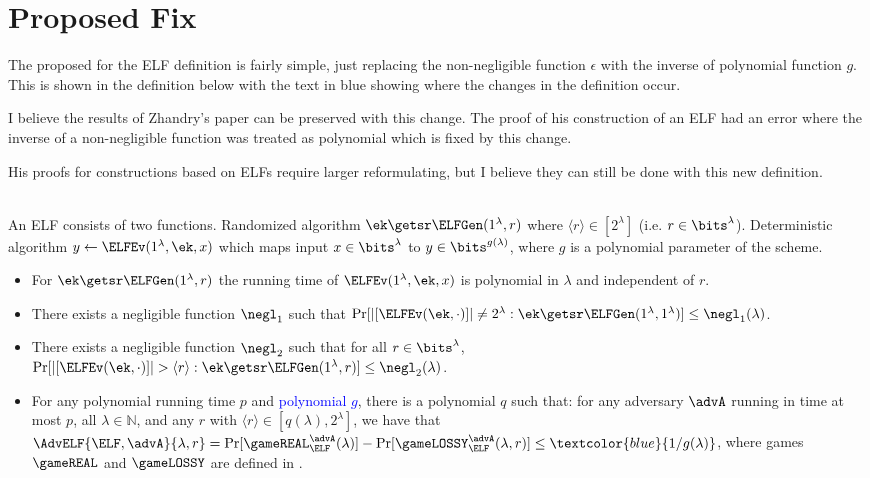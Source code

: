 
\section{Proposed Fix}\label{sec-fix}
The proposed for the ELF definition is fairly simple, just replacing the non-negligible function $\epsilon$ with the inverse of polynomial function $g$. This is shown in the definition below with the text in blue showing where the changes in the definition occur.

I believe the results of Zhandry's paper can be preserved with this change. The proof of his construction of an ELF had an error where the inverse of a non-negligible function was treated as polynomial which is fixed by this change.

His proofs for constructions based on ELFs require larger reformulating, but I believe they can still be done with this new definition.

\\
An ELF consists of two functions. Randomized algorithm $\ek\getsr\ELFGen(1^\lambda,r)$ where $\langle r\rangle \in [2^\lambda]$ (i.e. $r\in\bits^\lambda$). Deterministic algorithm $y \gets \ELFEv(1^\lambda,\ek,x)$ which maps input $x\in\bits^{\lambda}$ to $y\in\bits^{g(\lambda)}$, where $g$ is a polynomial parameter of the scheme.

\begin{itemize}
	\item For $\ek\getsr\ELFGen(1^\lambda,r)$ the running time of $\ELFEv(1^\lambda,\ek,x)$ is polynomial in $\lambda$ and independent of $r$.
	\item There exists a negligible function $\negl_1$ such that $\Pr[|[\ELFEv(\ek,\cdot)]|\neq 2^\lambda : \ek\getsr\ELFGen(1^\lambda,1^\lambda)]\leq \negl_1(\lambda)$.
	\item There exists a negligible function $\negl_2$ such that for all $r \in \bits^\lambda$, $\Pr[|[\ELFEv(\ek,\cdot)]| > \langle r\rangle : \ek\getsr\ELFGen(1^\lambda,r) ]\leq \negl_2(\lambda)$.
	\item For any polynomial running time $p$ and \textcolor{blue}{polynomial $g$}, there is a polynomial $q$ such that: for any adversary $\advA$ running in time at most $p$, all $\lambda\in\mathbb{N}$, and any $r$ with $\langle r \rangle \in [q(\lambda), 2^\lambda]$, we have that $\AdvELF{\ELF,\advA}{\lambda,r} \allowbreak =  \allowbreak\Pr[\gameREAL_{\ELF}^{\advA}(\lambda)]-\Pr[\gameLOSSY_{\ELF}^{\advA}(\lambda,r)]\allowbreak \le  \allowbreak \textcolor{blue}{1/g(\lambda)}$, where games $\gameREAL$ and $\gameLOSSY$ are defined in .
\end{itemize}



